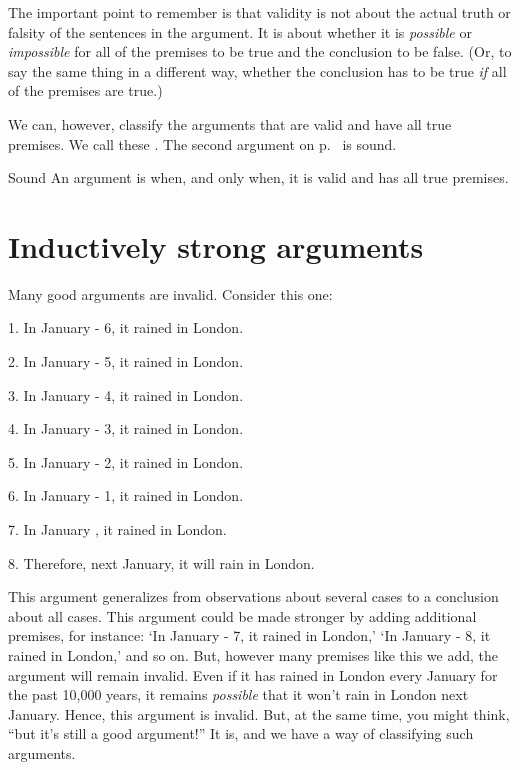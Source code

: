 The important point to remember is that validity is not about the actual truth or falsity of the sentences in the argument. It is about whether it is \emph{possible} or \emph{impossible} for all of the premises to be true and the conclusion to be false. (Or, to say the same thing in a different way, whether the conclusion has to be true \textit{if} all of the premises are true.)

We can, however, classify the arguments that are valid and have all true premises. We call these \label{def-sound-arg}. The second argument on p.~\pageref{valid-bananas} is sound.

\begin{factboxy}{Sound}
An argument is  when, and only when, it is valid and has all true premises.
\end{factboxy}


\section{Inductively strong arguments}
Many good arguments are invalid. Consider this one:
	\begin{earg}
		\item[1.] In January \the\numexpr \year - 6, it rained in London.
		\item[2.] In January \the\numexpr \year - 5, it rained in London.
		\item[3.] In January \the\numexpr \year - 4, it rained in London.
		\item[4.] In January \the\numexpr \year - 3, it rained in London.
		\item[5.] In January \the\numexpr \year - 2, it rained in London.
		\item[6.] In January \the\numexpr \year - 1, it rained in London.
		\item[7.] In January \the\year{}, it rained in London.
	\item[8.] Therefore, next January, it will rain in London.
\end{earg}

This argument generalizes from observations about several cases to a conclusion about all cases. This argument could be made stronger by adding additional premises, for instance: `In January \the\numexpr \year - 7, it rained in London,' `In January \the\numexpr \year - 8, it rained in London,' and so on. But, however many premises like this we add, the argument will remain invalid. Even if it has rained in London every January for the past 10,000 years, it remains \emph{possible} that it won't rain in London next January. Hence, this argument is invalid. But, at the same time, you might think, ``but it's still a good argument!'' It is, and we have a way of classifying such arguments.

